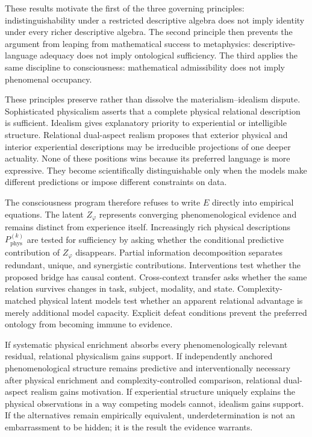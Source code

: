 These results motivate the first of the three governing principles: indistinguishability under a restricted descriptive algebra does not imply identity under every richer descriptive algebra. The second principle then prevents the argument from leaping from mathematical success to metaphysics: descriptive-language adequacy does not imply ontological sufficiency. The third applies the same discipline to consciousness: mathematical admissibility does not imply phenomenal occupancy.

These principles preserve rather than dissolve the materialism--idealism dispute. Sophisticated physicalism asserts that a complete physical relational description is sufficient. Idealism gives explanatory priority to experiential or intelligible structure. Relational dual-aspect realism proposes that exterior physical and interior experiential descriptions may be irreducible projections of one deeper actuality. None of these positions wins because its preferred language is more expressive. They become scientifically distinguishable only when the models make different predictions or impose different constraints on data.

The consciousness program therefore refuses to write $E$ directly into empirical equations. The latent $Z_\varphi$ represents converging phenomenological evidence and remains distinct from experience itself. Increasingly rich physical descriptions $P_{\mathrm{phys}}^{(k)}$ are tested for sufficiency by asking whether the conditional predictive contribution of $Z_\varphi$ disappears. Partial information decomposition separates redundant, unique, and synergistic contributions. Interventions test whether the proposed bridge has causal content. Cross-context transfer asks whether the same relation survives changes in task, subject, modality, and state. Complexity-matched physical latent models test whether an apparent relational advantage is merely additional model capacity. Explicit defeat conditions prevent the preferred ontology from becoming immune to evidence.

If systematic physical enrichment absorbs every phenomenologically relevant residual, relational physicalism gains support. If independently anchored phenomenological structure remains predictive and interventionally necessary after physical enrichment and complexity-controlled comparison, relational dual-aspect realism gains motivation. If experiential structure uniquely explains the physical observations in a way competing models cannot, idealism gains support. If the alternatives remain empirically equivalent, underdetermination is not an embarrassment to be hidden; it is the result the evidence warrants.

